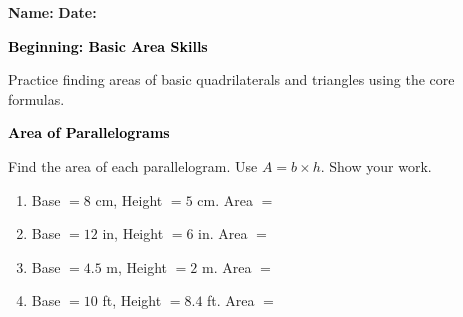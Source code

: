 \documentclass[12pt, letterpaper, fleqn]{article}
\newcommand{\blank}{\underline{\hspace{2.2cm}}}
\begin{document}
\textbf{Name:} \underline{\hspace{5cm}}
\hfill
\textbf{Date:} \underline{\hspace{3cm}}\\

\begin{tcolorbox}[colback=black!10]
    \large\textcolor{black}{\textbf{Beginning: Basic Area Skills}}
\end{tcolorbox}

\vspace{3mm}

\noindent
Practice finding areas of basic quadrilaterals and triangles using the core formulas.

\vspace{4mm}

\begin{tcolorbox}[colback=black!10]
\large\textcolor{black}{\textbf{Area of Parallelograms}}
\end{tcolorbox}

\noindent
Find the area of each parallelogram. Use $A = b \times h$. Show your work.

\vspace{3mm}

\begin{enumerate}[itemsep=1.5cm, leftmargin=0.6cm]

\item Base $= 8$ cm, Height $= 5$ cm. \quad Area $=$ \blank

\vspace{1.5cm}

\item Base $= 12$ in, Height $= 6$ in. \quad Area $=$ \blank

\vspace{1.5cm}

\item Base $= 4.5$ m, Height $= 2$ m. \quad Area $=$ \blank

\vspace{1.5cm}

\item Base $= 10$ ft, Height $= 8.4$ ft. \quad Area $=$ \blank

\vspace{1.5cm}

\end{enumerate}
\end{document}
